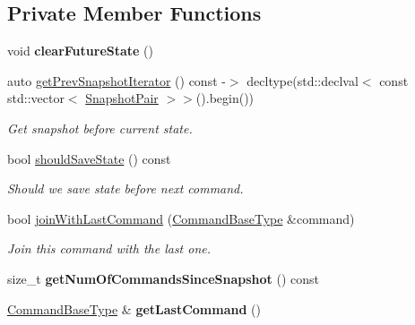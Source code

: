 \subsection*{Private Member Functions}
\begin{DoxyCompactItemize}
\item 
\mbox{\label{classpepr3d_1_1_command_manager_a9813d0996dc75f8a5f95ea6bb5627348}} 
void {\bfseries clear\+Future\+State} ()
\item 
\mbox{\label{classpepr3d_1_1_command_manager_a5f8002ebe6e7f1beb7f6176d424bae50}} 
auto \mbox{\hyperlink{classpepr3d_1_1_command_manager_a5f8002ebe6e7f1beb7f6176d424bae50}{get\+Prev\+Snapshot\+Iterator}} () const -\/$>$ decltype(std\+::declval$<$ const std\+::vector$<$ \mbox{\hyperlink{structpepr3d_1_1_command_manager_1_1_snapshot_pair}{Snapshot\+Pair}} $>$$>$().begin())
\begin{DoxyCompactList}\small\item\em Get snapshot before current state. \end{DoxyCompactList}\item 
\mbox{\label{classpepr3d_1_1_command_manager_a96a37fef29ecd232b90da0612b402310}} 
bool \mbox{\hyperlink{classpepr3d_1_1_command_manager_a96a37fef29ecd232b90da0612b402310}{should\+Save\+State}} () const
\begin{DoxyCompactList}\small\item\em Should we save state before next command. \end{DoxyCompactList}\item 
\mbox{\label{classpepr3d_1_1_command_manager_a40345eec97e82997c3e3a0f231185e30}} 
bool \mbox{\hyperlink{classpepr3d_1_1_command_manager_a40345eec97e82997c3e3a0f231185e30}{join\+With\+Last\+Command}} (\mbox{\hyperlink{classpepr3d_1_1_command_base}{Command\+Base\+Type}} \&command)
\begin{DoxyCompactList}\small\item\em Join this command with the last one. \end{DoxyCompactList}\item 
\mbox{\label{classpepr3d_1_1_command_manager_a9a231ac7e910086a522676323b69b9c4}} 
size\+\_\+t {\bfseries get\+Num\+Of\+Commands\+Since\+Snapshot} () const
\item 
\mbox{\label{classpepr3d_1_1_command_manager_abc272c27fa76a577f4af8fd863d70368}} 
\mbox{\hyperlink{classpepr3d_1_1_command_base}{Command\+Base\+Type}} \& {\bfseries get\+Last\+Command} ()
\end{DoxyCompactItemize}
